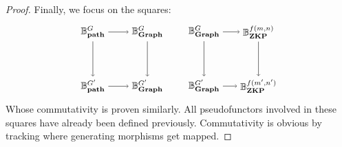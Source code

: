 \begin{proof}
  Finally, we focus on the squares:
  \begin{equation*}
    \begin{tikzpicture}
      \node (Bpath) at (0,2) {$\Bpath{G}$};
      \node (Bpath') at (0,0) {$\Bpath{G'}$};
      \node (Bgraph) at (2,2) {$\Bgraph{G}$}; 
      \node (Bgraph') at (2,0) {$\Bgraph{G'}$}; 
      \draw[->] (Bpath) -- (Bgraph);
      \draw[->] (Bpath') -- (Bgraph');
      \draw[->] (Bgraph) -- (Bgraph');
      \draw[->] (Bpath) -- (Bpath');
    \end{tikzpicture}
    \qquad
    \begin{tikzpicture}
      \node (Bgraph) at (0,2) {$\Bgraph{G}$};
      \node (Bgraph') at (0,0) {$\Bgraph{G'}$};
      \node (Bzkp) at (2,2) {$\Bzkp{f(m,n)}$}; 
      \node (Bzkp') at (2,0) {$\Bzkp{f(m',n')}$}; 
      \draw[->] (Bgraph) -- (Bzkp);
      \draw[->] (Bgraph') -- (Bzkp');
      \draw[->] (Bzkp) -- (Bzkp');
      \draw[->] (Bgraph) -- (Bgraph');
    \end{tikzpicture}
  \end{equation*}
  Whose commutativity is proven similarly. 
  All pseudofunctors involved in these squares 
  have already been defined previously. Commutativity 
  is obvious by tracking where generating morphisms get 
  mapped.
\end{proof} 